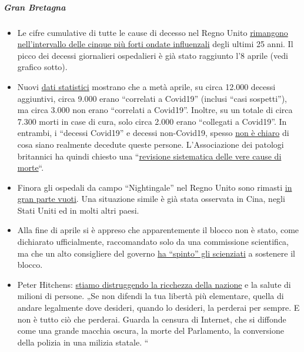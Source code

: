 \hypertarget{gran-bretagna}{%
\subparagraph{\texorpdfstring{\textbf{Gran
Bretagna}}{Gran Bretagna}}\label{gran-bretagna}}

\begin{itemize}
\tightlist
\item
  Le cifre cumulative di tutte le cause di decesso nel Regno Unito
  \href{http://inproportion2.talkigy.com/}{rimangono nell'intervallo
  delle cinque più forti ondate influenzali} degli ultimi 25 anni. Il
  picco dei decessi giornalieri ospedalieri è già stato raggiunto l'8
  aprile (vedi grafico sotto).
\item
  Nuovi
  \href{https://www.telegraph.co.uk/politics/2020/05/01/evidence-rising-britains-lockdown-could-deadly-mistake/}{dati
  statistici} mostrano che a metà aprile, su circa 12.000 decessi
  aggiuntivi, circa 9.000 erano ``correlati a Covid19'' (inclusi ``casi
  sospetti''), ma circa 3.000 non erano ``correlati a Covid19''.
  Inoltre, su un totale di circa 7.300 morti in case di cura, solo circa
  2.000 erano ``collegati a Covid19''. In entrambi, i ``decessi
  Covid19'' e decessi non-Covid19, spesso
  \href{https://www.hsj.co.uk/commissioning/thousands-of-extra-deaths-outside-hospital-not-attributed-to-covid-19/7027459.article}{non
  è chiaro} di cosa siano realmente decedute queste persone.
  L'Associazione dei patologi britannici ha quindi chiesto una
  ``\href{https://www.hsj.co.uk/coronavirus/systematic-reviews-to-discover-true-cause-of-outbreak-deaths/7027491.article}{revisione
  sistematica delle vere cause di morte}``.
\item
  Finora gli ospedali da campo ``Nightingale'' nel Regno Unito sono
  rimasti
  \href{https://www.telegraph.co.uk/news/0/do-many-nhs-nightingale-hospitals-remain-empty/}{in
  gran parte vuoti}. Una situazione simile è già stata osservata in
  Cina, negli Stati Uniti ed in molti altri paesi.
\item
  Alla fine di aprile si è appreso che apparentemente il blocco non è
  stato, come dichiarato ufficialmente, raccomandato solo da una
  commissione scientifica, ma che un alto consigliere del governo
  \href{https://www.bloomberg.com/news/articles/2020-04-28/top-aide-to-u-k-s-johnson-pushed-scientists-to-back-lockdown}{ha
  ``spinto'' gli scienziati} a sostenere il blocco.
\item
  Peter Hitchens:
  \href{https://hitchensblog.mailonsunday.co.uk/2020/05/peter-hitchens-were-destroying-the-nations-wealth-and-the-health-of-millions.html}{stiamo
  distruggendo la ricchezza della nazione} e la salute di milioni di
  persone. „Se non difendi la tua libertà più elementare, quella di
  andare legalmente dove desideri, quando lo desideri, la perderai per
  sempre. E non è tutto ciò che perderai. Guarda la censura di Internet,
  che si diffonde come una grande macchia oscura, la morte del
  Parlamento, la conversione della polizia in una milizia statale. ``
\end{itemize}


